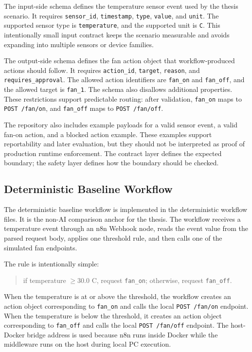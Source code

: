 The input-side schema defines the temperature sensor event used by the thesis scenario. It requires \texttt{sensor\_id}, \texttt{timestamp}, \texttt{type}, \texttt{value}, and \texttt{unit}. The supported sensor type is \texttt{temperature}, and the supported unit is \texttt{C}. This intentionally small input contract keeps the scenario measurable and avoids expanding into multiple sensors or device families.

The output-side schema defines the fan action object that workflow-produced actions should follow. It requires \texttt{action\_id}, \texttt{target}, \texttt{reason}, and \texttt{requires\_approval}. The allowed action identifiers are \texttt{fan\_on} and \texttt{fan\_off}, and the allowed target is \texttt{fan\_1}. The schema also disallows additional properties. These restrictions support predictable routing: after validation, \texttt{fan\_on} maps to \texttt{POST /fan/on}, and \texttt{fan\_off} maps to \texttt{POST /fan/off}.

The repository also includes example payloads for a valid sensor event, a valid fan-on action, and a blocked action example. These examples support reportability and later evaluation, but they should not be interpreted as proof of production runtime enforcement. The contract layer defines the expected boundary; the safety layer defines how the boundary should be checked.

\subsection{Deterministic Baseline Workflow}\label{subsec:implementation-deterministic}

The deterministic baseline workflow is implemented in the deterministic workflow files. It is the non-AI comparison anchor for the thesis. The workflow receives a temperature event through an n8n Webhook node, reads the event value from the parsed request body, applies one threshold rule, and then calls one of the simulated fan endpoints.

The rule is intentionally simple:

\begin{quote}
if temperature \(\geq 30.0\) C, request \texttt{fan\_on}; otherwise, request \texttt{fan\_off}.
\end{quote}

When the temperature is at or above the threshold, the workflow creates an action object corresponding to \texttt{fan\_on} and calls the local \texttt{POST /fan/on} endpoint. When the temperature is below the threshold, it creates an action object corresponding to \texttt{fan\_off} and calls the local \texttt{POST /fan/off} endpoint. The host-Docker bridge address is used because n8n runs inside Docker while the middleware runs on the host during local PC execution.

